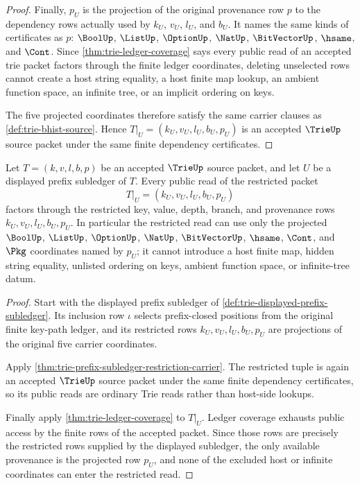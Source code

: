 \begin{proof}
Finally, $p_U$ is the projection of the original provenance row $p$ to the dependency rows actually used by $k_U$, $v_U$, $l_U$, and $b_U$. It names the same kinds of certificates as $p$: $\BoolUp$, $\ListUp$, $\OptionUp$, $\NatUp$, $\BitVectorUp$, $\hsame$, and $\Cont$. Since \autoref{thm:trie-ledger-coverage} says every public read of an accepted trie packet factors through the finite ledger coordinates, deleting unselected rows cannot create a host string equality, a host finite map lookup, an ambient function space, an infinite tree, or an implicit ordering on keys.

The five projected coordinates therefore satisfy the same carrier clauses as \autoref{def:trie-bhist-source}. Hence $T|_U=(k_U,v_U,l_U,b_U,p_U)$ is an accepted $\TrieUp$ source packet under the same finite dependency certificates.
\end{proof}

\begin{theorem}\label{thm:trie-prefix-subledger-formal-target}
Let $T=(k,v,l,b,p)$ be an accepted $\TrieUp$ source packet, and let $U$ be a displayed prefix subledger of $T$. Every public read of the restricted packet
$$
T|_U=(k_U,v_U,l_U,b_U,p_U)
$$
factors through the restricted key, value, depth, branch, and provenance rows $k_U,v_U,l_U,b_U,p_U$. In particular the restricted read can use only the projected $\BoolUp$, $\ListUp$, $\OptionUp$, $\NatUp$, $\BitVectorUp$, $\hsame$, $\Cont$, and $\Pkg$ coordinates named by $p_U$; it cannot introduce a host finite map, hidden string equality, unlisted ordering on keys, ambient function space, or infinite-tree datum.
\end{theorem}
\begin{proof}
Start with the displayed prefix subledger of \autoref{def:trie-displayed-prefix-subledger}. Its inclusion row $\iota$ selects prefix-closed positions from the original finite key-path ledger, and its restricted rows $k_U,v_U,l_U,b_U,p_U$ are projections of the original five carrier coordinates.

Apply \autoref{thm:trie-prefix-subledger-restriction-carrier}. The restricted tuple is again an accepted $\TrieUp$ source packet under the same finite dependency certificates, so its public reads are ordinary Trie reads rather than host-side lookups.

Finally apply \autoref{thm:trie-ledger-coverage} to $T|_U$. Ledger coverage exhausts public access by the finite rows of the accepted packet. Since those rows are precisely the restricted rows supplied by the displayed subledger, the only available provenance is the projected row $p_U$, and none of the excluded host or infinite coordinates can enter the restricted read.
\end{proof}

